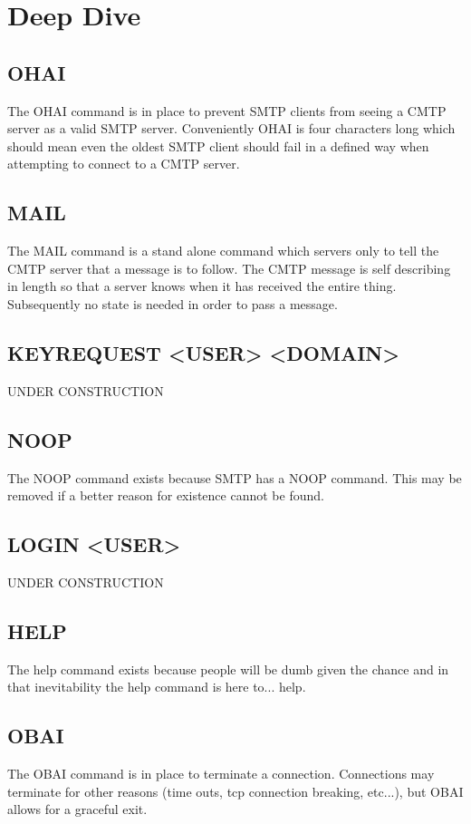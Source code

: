\documentclass[a4paper,11pt]{article}
\begin{document}
\section{Deep Dive}
\subsection{OHAI}
The OHAI command is in place to prevent SMTP clients from seeing a CMTP server as a valid SMTP server. Conveniently OHAI is four characters long which should mean even the oldest SMTP client should fail in a defined way when attempting to connect to a CMTP server.
\subsection{MAIL}
The MAIL command is a stand alone command which servers only to tell the CMTP server that a message is to follow. The CMTP message is self describing in length so that a server knows when it has received the entire thing. Subsequently no state is needed in order to pass a message.
\subsection{KEYREQUEST <USER> <DOMAIN>}
UNDER CONSTRUCTION
\subsection{NOOP}
The NOOP command exists because SMTP has a NOOP command. This may be removed if a better reason for existence cannot be found.
\subsection{LOGIN <USER>}
UNDER CONSTRUCTION
\subsection{HELP}
The help command exists because people will be dumb given the chance and in that inevitability the help command is here to... help.
\subsection{OBAI}
The OBAI command is in place to terminate a connection. Connections may terminate for other reasons (time outs, tcp connection breaking, etc...), but OBAI allows for a graceful exit. 
\end{document}
